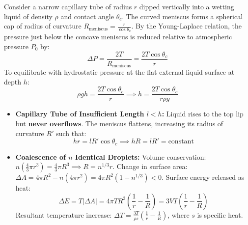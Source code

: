 \documentclass[10pt,a4paper]{article}
\begin{document}
\begin{formulabox}
Consider a narrow capillary tube of radius $r$ dipped vertically into a wetting liquid of density $\rho$ and contact angle $\theta_c$.
The curved meniscus forms a spherical cap of radius of curvature $R_{\text{meniscus}} = \frac{r}{\cos\theta_c}$.
By the Young-Laplace relation, the pressure just below the concave meniscus is reduced relative to atmospheric pressure $P_0$ by:
\begin{equation}
  \Delta P = \frac{2T}{R_{\text{meniscus}}} = \frac{2T\cos\theta_c}{r}
\end{equation}
To equilibrate with hydrostatic pressure at the flat external liquid surface at depth $h$:
\begin{equation}
  \rho g h = \frac{2T\cos\theta_c}{r} \implies h = \frac{2T\cos\theta_c}{r\rho g}
\end{equation}
\end{formulabox}

\begin{usecasebox}
\begin{itemize}
  \item \textbf{Capillary Tube of Insufficient Length $l < h$:} Liquid rises to the top lip but \textbf{never overflows}. The meniscus flattens, increasing its radius of curvature $R'$ such that:
  \begin{equation}
    h r = l R' \cos\theta_c \implies h R = l R' = \text{constant}
  \end{equation}
  \item \textbf{Coalescence of $n$ Identical Droplets:}
  Volume conservation: $n\left(\frac{4}{3}\pi r^3\right) = \frac{4}{3}\pi R^3 \implies R = n^{1/3}r$.
  Change in surface area: $\Delta A = 4\pi R^2 - n(4\pi r^2) = 4\pi R^2(1 - n^{1/3}) < 0$.
  Surface energy released as heat:
  \begin{equation}
    \Delta E = T|\Delta A| = 4\pi T R^3\left(\frac{1}{r} - \frac{1}{R}\right) = 3 V T\left(\frac{1}{r} - \frac{1}{R}\right)
  \end{equation}
  Resultant temperature increase: $\Delta T = \frac{3T}{\rho s}\left(\frac{1}{r} - \frac{1}{R}\right)$, where $s$ is specific heat.
\end{itemize}
\end{usecasebox}

\end{document}
